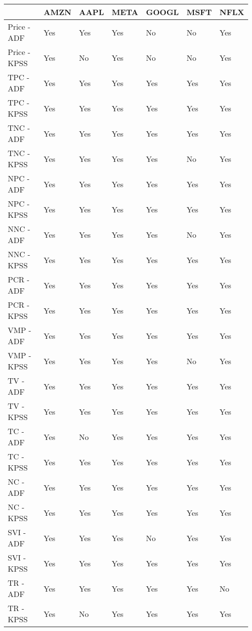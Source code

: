 \begin{tabular}{lllllll}
\toprule
{} & AMZN & AAPL & META & GOOGL & MSFT & NFLX \\
\midrule
Price - ADF  &  Yes &  Yes &  Yes &    No &   No &  Yes \\
Price - KPSS &  Yes &   No &  Yes &    No &   No &  Yes \\
TPC - ADF    &  Yes &  Yes &  Yes &   Yes &  Yes &  Yes \\
TPC - KPSS   &  Yes &  Yes &  Yes &   Yes &  Yes &  Yes \\
TNC - ADF    &  Yes &  Yes &  Yes &   Yes &  Yes &  Yes \\
TNC - KPSS   &  Yes &  Yes &  Yes &   Yes &   No &  Yes \\
NPC - ADF    &  Yes &  Yes &  Yes &   Yes &  Yes &  Yes \\
NPC - KPSS   &  Yes &  Yes &  Yes &   Yes &  Yes &  Yes \\
NNC - ADF    &  Yes &  Yes &  Yes &   Yes &   No &  Yes \\
NNC - KPSS   &  Yes &  Yes &  Yes &   Yes &  Yes &  Yes \\
PCR - ADF    &  Yes &  Yes &  Yes &   Yes &  Yes &  Yes \\
PCR - KPSS   &  Yes &  Yes &  Yes &   Yes &  Yes &  Yes \\
VMP - ADF    &  Yes &  Yes &  Yes &   Yes &  Yes &  Yes \\
VMP - KPSS   &  Yes &  Yes &  Yes &   Yes &   No &  Yes \\
TV - ADF     &  Yes &  Yes &  Yes &   Yes &  Yes &  Yes \\
TV - KPSS    &  Yes &  Yes &  Yes &   Yes &  Yes &  Yes \\
TC - ADF     &  Yes &   No &  Yes &   Yes &  Yes &  Yes \\
TC - KPSS    &  Yes &  Yes &  Yes &   Yes &  Yes &  Yes \\
NC - ADF     &  Yes &  Yes &  Yes &   Yes &  Yes &  Yes \\
NC - KPSS    &  Yes &  Yes &  Yes &   Yes &  Yes &  Yes \\
SVI - ADF    &  Yes &  Yes &  Yes &    No &  Yes &  Yes \\
SVI - KPSS   &  Yes &  Yes &  Yes &   Yes &  Yes &  Yes \\
TR - ADF     &  Yes &  Yes &  Yes &   Yes &  Yes &   No \\
TR - KPSS    &  Yes &   No &  Yes &   Yes &  Yes &  Yes \\
\bottomrule
\end{tabular}
